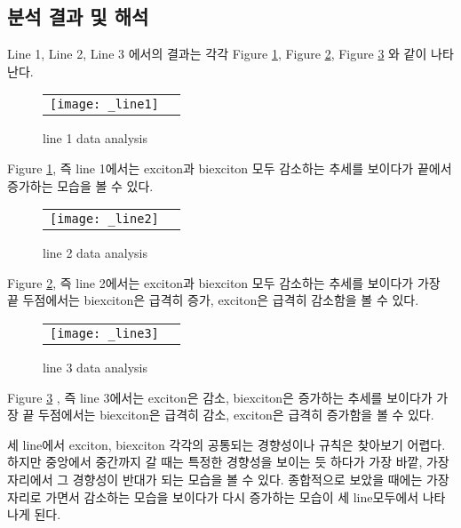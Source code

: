 \subsection{분석 결과 및 해석}
Line 1, Line 2, Line 3 에서의 결과는 각각 Figure \ref{fig:line1}, Figure \ref{fig:line2}, Figure \ref{fig:line3} 와 같이 나타난다.
\begin{figure}[H]
	\begin{center}
		\begin{tabular}{cc}
			\texttt{[image: \_line1]}
		\end{tabular}
	\end{center}
	\caption{line 1 data analysis}
	\label{fig:line1}  
\end{figure}
Figure \ref{fig:line1}, 즉 line 1에서는 exciton과 biexciton 모두 감소하는 추세를 보이다가 끝에서 증가하는 모습을 볼 수 있다.
\begin{figure}[H]
	\begin{center}
		\begin{tabular}{cc}
			\texttt{[image: \_line2]}
		\end{tabular}
	\end{center}
	\caption{line 2 data analysis}
	\label{fig:line2}  
\end{figure}
Figure \ref{fig:line2}, 즉 line 2에서는 exciton과 biexciton 모두 감소하는 추세를 보이다가 가장 끝 두점에서는 biexciton은 급격히 증가, exciton은 급격히 감소함을 볼 수 있다.

\begin{figure}[H]
	\begin{center}
		\begin{tabular}{cc}
			\texttt{[image: \_line3]}
		\end{tabular}
	\end{center}
	\caption{line 3 data analysis}
	\label{fig:line3}  
\end{figure}
Figure \ref{fig:line3} , 즉 line 3에서는 exciton은 감소, biexciton은 증가하는 추세를 보이다가 가장 끝 두점에서는 biexciton은 급격히 감소, exciton은 급격히 증가함을 볼 수 있다.

세 line에서 exciton, biexciton 각각의 공통되는 경향성이나 규칙은 찾아보기 어렵다. 하지만 중앙에서 중간까지 갈 때는 특정한 경향성을 보이는 듯 하다가 가장 바깥, 가장자리에서 그 경향성이 반대가 되는 모습을 볼 수 있다. 종합적으로 보았을 때에는 가장자리로 가면서 감소하는 모습을 보이다가 다시 증가하는 모습이 세 line모두에서 나타나게 된다.
